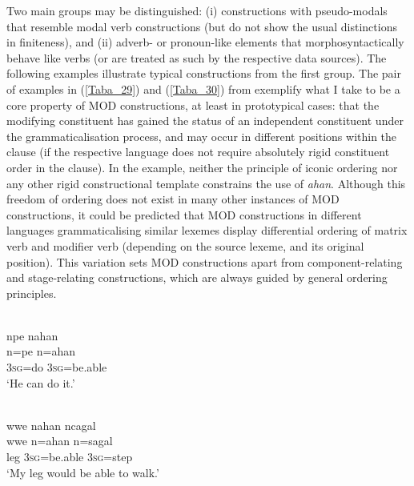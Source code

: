 Two main groups may be distinguished: (i) constructions with pseudo-modals that resemble modal verb constructions (but do not show the usual distinctions in finiteness), and (ii) adverb- or pronoun-like elements that morphosyntactically behave like verbs (or are treated as such by the respective data sources). The following examples illustrate typical constructions from the first group. The pair of examples in (\ref{Taba_29}) and (\ref{Taba_30}) from  exemplify what I take to be a core property of MOD constructions, at least in prototypical cases: that the modifying constituent has gained the status of an independent constituent under the grammaticalisation process, and may occur in different positions within the clause (if the respective language does not require absolutely rigid constituent order in the clause). In the  example, neither the principle of iconic ordering nor any other rigid constructional template constrains the use of \textit{ahan}. Although this freedom of ordering does not exist in many other instances of MOD constructions, it could be predicted that MOD constructions in different languages grammaticalising similar lexemes display differential ordering of matrix verb and modifier verb (depending on the source lexeme, and its original position). This variation sets MOD constructions apart from component-relating and stage-relating constructions, which are always guided by general ordering principles.

\ea \label{Taba_29}
\\
\glll npe nahan \\
n=pe n=ahan \\
3\textsc{sg}=do 3\textsc{sg}=be.able \\
\glft `He can do it.'\\ 
\z

\ea \label{Taba_30}
\\
\glll wwe nahan ncagal \\
wwe n=ahan n=sagal \\
leg 3\textsc{sg}=be.able 3\textsc{sg}=step \\
\glft `My leg would be able to walk.'\\ 
\z

